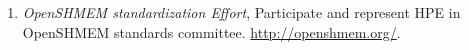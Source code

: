 \begin{enumerate}
\setcounter{enumi}{0}
\item \textit{OpenSHMEM standardization Effort}, Participate and represent HPE
in OpenSHMEM standards committee. \url{http://openshmem.org/}.
\end{enumerate}
